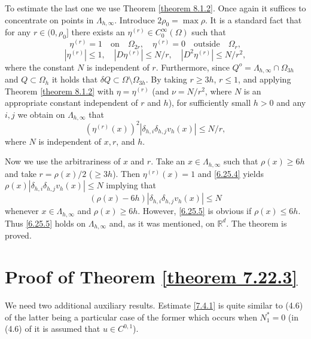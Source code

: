 \documentclass[11pt, reqno]{amsart}
\theoremstyle{definition}
\theoremstyle{remark}
\begin{document}
To estimate the last one we use Theorem \ref{theorem 8.1.2}.
Once again it suffices to concentrate on points in $\Lambda_{h,\infty}$.
Introduce $2\rho_{0}=\max\rho$.
It is a standard fact that for any $r\in(0,\rho_{0}]$ there exists an $\eta^{(r)}
\in C^{\infty}_{0}(\Omega)$ such that
$$
\eta^{(r)}=1\quad\text{on}\quad \Omega_{2r},\quad
\eta^{(r)}=0\quad\text{outside}\quad \Omega_{r},
$$
$$
|\eta^{(r)}|\leq1,\quad
|D\eta^{(r)}|\leq N/r,\quad|D^{2}\eta^{(r)}|\leq N/r^{2},
$$
where the constant $N$ is independent of $r$.
Furthermore, since $Q^{o}=\Lambda_{h,\infty}\cap\Omega_{3h}$
and $Q\subset\Omega_{h}$ it holds that
$\delta Q\subset \Omega\setminus \Omega_{3h}$. By taking
$r\geq 3h$, $r\leq1$, and
applying
Theorem \ref{theorem 8.1.2} with $\eta=\eta^{(r)}$ (and
$\nu=N/r^{2}$, where $N$ is an appropriate constant
independent of $r$ and $h$), 
 for sufficiently small $h>0$ and any $i,j$ 
we obtain on $\Lambda_{h,\infty}$
that 
\begin{equation}
                                       \label{6.25.4}
(\eta^{(r)}(x))^{2}|\delta_{h,i}\delta_{h,j}v_{h}(x)|\leq N/r,
\end{equation}
where $N$ is independent of $x,r$, and $h$.

Now we use the arbitrariness of $x$ and $r$. Take an $x\in\Lambda_{h,\infty}$
such that $\rho(x)\geq6h$ and take $r=\rho(x)/2$ ($\geq3h$).
Then $\eta^{(r)}(x)=1$ and \eqref{6.25.4} yields
$\rho(x)|\delta_{h,i}\delta_{h,j}v_{h}(x)|\leq N$ implying that
\begin{equation}
                                       \label{6.25.5}
(\rho(x)-6h)|\delta_{h,i}\delta_{h,j}v_{h}(x)|\leq N
\end{equation}
whenever $x\in\Lambda_{h,\infty}$ and
 $\rho(x)\geq6h$.
 However, \eqref{6.25.5} is obvious
if $\rho(x)\leq6h$. Thus \eqref{6.25.5} holds on $\Lambda_{h,\infty}$
and, as it was mentioned, on ${\mathbb{R}}^{d}$. The theorem is
proved.

{\section{{Proof of Theorem \protect\ref{theorem 7.22.3}}}
      \setcounter{equation}{0}}
                                           \label{section 7.5.2}

We need two additional auxiliary results. Estimate \eqref{7.4.1} is quite similar
to (4.6) of \cite{DK05}
the latter being a particular case of the former
which occurs when $N_{1}^{*}=0$ (in (4.6) of \cite{DK05}
 it is assumed that
$u\in C^{0,1}$).
\end{document}

